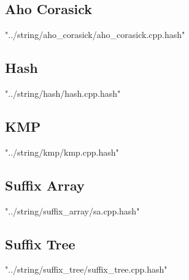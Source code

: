 \documentclass [12pt,onecolumn,oneside]{article}
\begin{document}
\subsection{ Aho Corasick}
 {"../string/aho_corasick/aho_corasick.cpp.hash"}
\newpage

\subsection{ Hash}
 {"../string/hash/hash.cpp.hash"}
\newpage

\subsection{ KMP}
 {"../string/kmp/kmp.cpp.hash"}
\newpage

\subsection{ Suffix Array}
 {"../string/suffix_array/sa.cpp.hash"}
\newpage

\subsection{ Suffix Tree}
 {"../string/suffix_tree/suffix_tree.cpp.hash"}
\newpage
\end{document}
